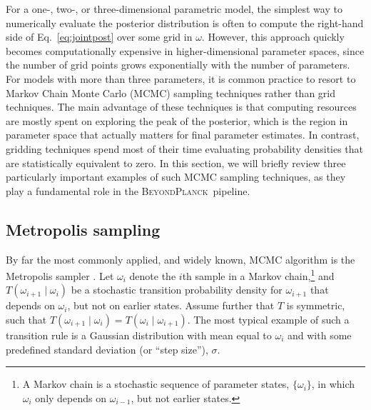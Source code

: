 \documentclass[onecolumn]{aa}
\newcommand{\BP}{\textsc{BeyondPlanck}}
\begin{document}
For a one-, two-, or three-dimensional parametric model, the simplest
way to numerically evaluate the posterior distribution is often to
compute the right-hand side of Eq.~\eqref{eq:jointpost} over some grid
in $\omega$. However, this approach quickly becomes computationally
expensive in higher-dimensional parameter spaces, since the number of
grid points grows exponentially with the number of parameters. For
models with more than three parameters, it is common practice to
resort to Markov Chain Monte Carlo (MCMC) sampling techniques rather
than grid techniques. The main advantage of these techniques is that
computing resources are mostly spent on exploring the peak of the
posterior, which is the region in parameter space that actually
matters for final parameter estimates. In contrast, gridding
techniques spend most of their time evaluating probability densities
that are statistically equivalent to zero. In this section, we will
briefly review three particularly important examples of such MCMC
sampling techniques, as they play a fundamental role in the
\BP\ pipeline.

\subsection{Metropolis sampling}
\label{sec:metropolis}

By far the most commonly applied, and widely known, MCMC algorithm is
the Metropolis sampler \citep{metropolis:1953}. Let $\omega_i$ denote
the $i$th sample in a Markov chain,\footnote{A Markov chain is a
  stochastic sequence of parameter states, $\{\omega_i\}$, in which
  $\omega_i$ only depends on $\omega_{i-1}$, but not earlier states.}
and $T(\omega_{i+1}\mid \omega_i)$ be a stochastic transition probability
density for $\omega_{i+1}$ that depends on $\omega_i$, but not on
earlier states. Assume further that $T$ is symmetric, such that
$T(\omega_{i+1}\mid \omega_i) = T(\omega_i\mid \omega_{i+1})$. The most
typical example of such a transition rule is a Gaussian distribution
with mean equal to $\omega_i$ and with some predefined standard
deviation (or ``step size''), $\sigma$.
\end{document}
